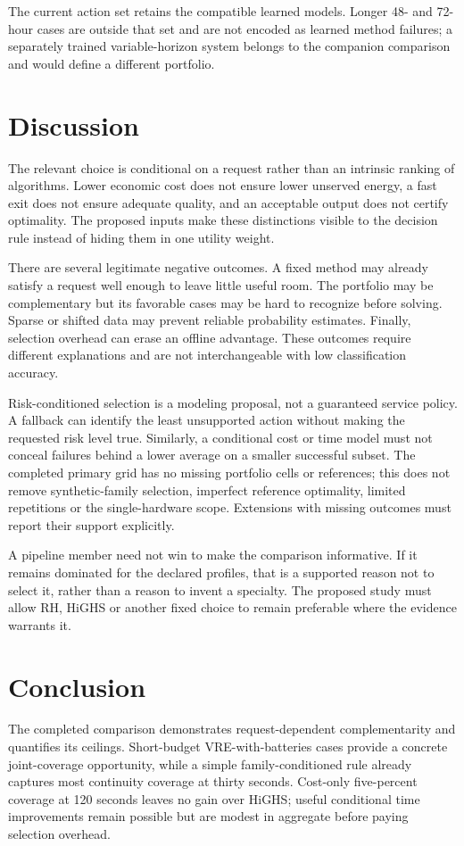 The current action set retains the compatible learned models. Longer
48- and 72-hour cases are outside that set and are not encoded as learned
method failures; a separately trained variable-horizon system belongs to
the companion comparison and would define a different portfolio.

\section{Discussion}
The relevant choice is conditional on a request rather than an intrinsic
ranking of algorithms. Lower economic cost does not ensure lower unserved
energy, a fast exit does not ensure adequate quality, and an acceptable
output does not certify optimality. The proposed inputs make these distinctions
visible to the decision rule instead of hiding them in one utility weight.

There are several legitimate negative outcomes. A fixed method may already
satisfy a request well enough to leave little useful room. The portfolio may
be complementary but its favorable cases may be hard to recognize before
solving. Sparse or shifted data may prevent reliable probability estimates.
Finally, selection overhead can erase an offline advantage. These outcomes
require different explanations and are not interchangeable with low
classification accuracy.

Risk-conditioned selection is a modeling proposal, not a guaranteed service
policy. A fallback can identify the least unsupported action without making
the requested risk level true. Similarly, a conditional cost or time model
must not conceal failures behind a lower average on a smaller successful
subset. The completed primary grid has no missing portfolio cells
or references; this does not remove synthetic-family selection, imperfect
reference optimality, limited repetitions or the single-hardware scope.
Extensions with missing outcomes must report their support explicitly.

A pipeline member need not win to make the comparison informative. If it
remains dominated for the declared profiles, that is a supported reason not
to select it, rather than a reason to invent a specialty. The proposed
study must allow RH, HiGHS or another fixed choice to remain preferable
where the evidence warrants it.

\section{Conclusion}
The completed comparison demonstrates request-dependent complementarity and
quantifies its ceilings. Short-budget VRE-with-batteries cases provide a
concrete joint-coverage opportunity, while a simple family-conditioned rule
already captures most continuity coverage at thirty seconds. Cost-only
five-percent coverage at 120 seconds leaves no gain over HiGHS; useful
conditional time improvements remain possible but are modest in aggregate
before paying selection overhead.

